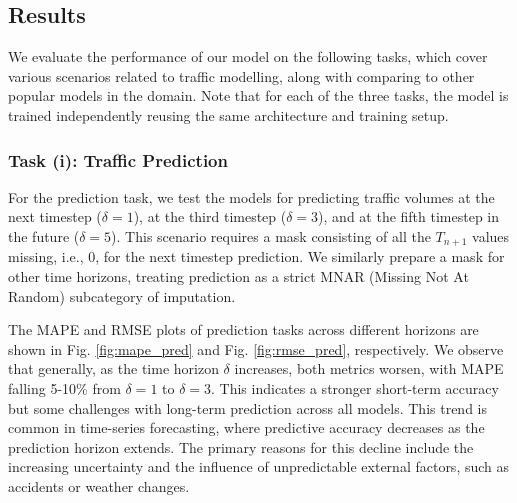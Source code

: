 \subsection{Results}

We evaluate the performance of our model on the following tasks, which cover various scenarios related to traffic modelling, along with comparing to other popular models in the domain. Note that for each of the three tasks, the model is trained independently reusing the same architecture and training setup.

\subsubsection{Task (i): Traffic Prediction}

For the prediction task, we test the models for predicting traffic volumes at the next timestep (\(\delta = 1\)), at the third timestep (\(\delta = 3\)), and at the fifth timestep in the future (\(\delta = 5\)). This scenario requires a mask consisting of all the \(T_{n+1}\) values missing, i.e., 0, for the next timestep prediction. We similarly prepare a mask for other time horizons, treating prediction as a strict MNAR (Missing Not At Random) subcategory of imputation.

The MAPE and RMSE plots of prediction tasks across different horizons are shown in Fig. \ref{fig:mape_pred} and Fig. \ref{fig:rmse_pred}, respectively. We observe that generally, as the time horizon \(\delta\) increases, both metrics worsen, with MAPE falling 5-10\% from \(\delta=1\) to \(\delta=3\). This indicates a stronger short-term accuracy but some challenges with long-term prediction across all models. This trend is common in time-series forecasting, where predictive accuracy decreases as the prediction horizon extends. The primary reasons for this decline include the increasing uncertainty and the influence of unpredictable external factors, such as accidents or weather changes.

